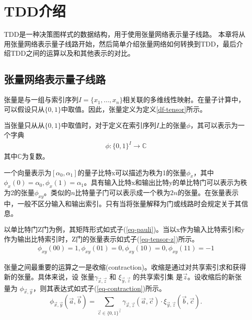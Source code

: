 \chapter{TDD介绍}
TDD是一种决策图样式的数据结构，用于使用张量网络表示量子线路。
本章将从用张量网络表示量子线路开始，然后简单介绍张量网络如何转换到TDD，最后介绍TDD之间的运算以及和其他表示的对比。
\section{张量网络表示量子线路}
张量是与一组与索引序列\(I=\{x_1,\ldots,x_n\}\)相关联的多维线性映射。在量子计算中，可以假设只从\(\{0,1\}\)中取值。因此，张量定义为定义\ref{df-tensor}所示。
\begin{definition}
    \label{df-tensor}
    当张量只从从\(\{0,1\}\)中取值时，对于定义在索引序列\(I\)上的张量\(\phi\)，其可以表示为一个字典
    \begin{align}
        \phi :{\{0,1\}}^I\rightarrow\mathbb{C}
    \end{align}
    其中\(\mathbb{C}\)为复数。
\end{definition}


一个向量表示为$[\alpha_0,\alpha_1]$的量子比特x可以描述为秩为1的张量$\phi_x$，其中$\phi_x\left(0\right)=\alpha_0, \phi_x\left(1\right)=\alpha_1$。具有输入比特x和输出比特y的单比特门可以表示为秩为2的张量$\phi_{xy}$。类似的$n$比特量子门可以表示成一个秩为$2n$的张量。在张量表示中，一般不区分输入和输出索引。只有当将张量解释为门或线路时会规定关于其信息。
\begin{example}
    以单比特门Z门为例，其矩阵形式如式子(\ref{eq-pauli})。当以x作为输入比特索引和y作为输出比特索引时，Z门的张量表示如式子(\ref{eq-tensor-z})所示。
    \begin{align}
        \label{eq-tensor-z}
        \phi_{xy}\left(00\right)=1,\phi_{xy}\left(01\right)=0,\phi_{xy}\left(10\right)=0,\phi_{xy}\left(11\right)=-1
    \end{align}
\end{example}

张量之间最重要的运算之一是收缩(contraction)。收缩是通过对共享索引求和获得新的张量。具体来说，设 张量$\gamma_{\overrightarrow{x},\overrightarrow{z}}$ 和 $\xi_{\overrightarrow{y},\overrightarrow{z}}$ 的共享索引集 是$\overrightarrow{z}$。设收缩后的新张量为 $\phi_{\overrightarrow{x},\overrightarrow{y}}$，则其表达式如式子(\ref{eq-contraction})所示。
\begin{equation}
\label{eq-contraction}
\phi_{\overrightarrow{x},\overrightarrow{y}}(\overrightarrow{a},\overrightarrow{b}) = \sum_{\overrightarrow{c} \in \{0,1\}^{\overrightarrow{z}}} \gamma_{\overrightarrow{x},\overrightarrow{z}}(\overrightarrow{a}, \overrightarrow{c}) \cdot \xi_{\overrightarrow{y},\overrightarrow{z}}(\overrightarrow{b}, \overrightarrow{c}).
\end{equation}

